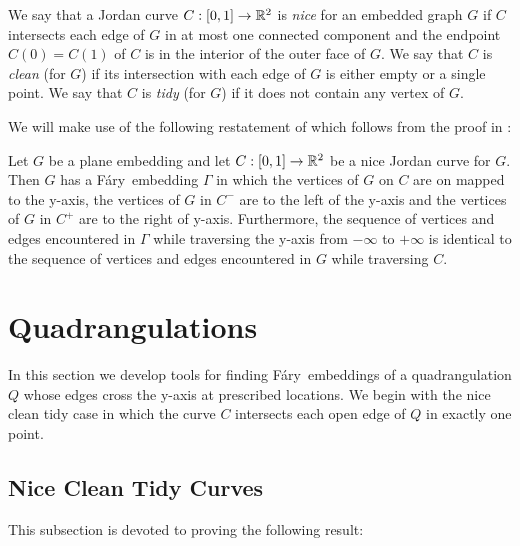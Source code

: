 \documentclass{patmorin}
\newcommand{\Fary}{Fáry}
\begin{document}
We say that a Jordan curve $C:[0,1]\to\mathbb{R}^2$ is \emph{nice} for an embedded
graph $G$ if $C$ intersects each edge of $G$ in at most one connected
component and the endpoint $C(0)=C(1)$ of $C$ is in the interior of the
outer face of $G$.  We say that $C$ is \emph{clean} (for $G$) if its
intersection with each edge of $G$ is either empty or a single point.
We say that $C$ is \emph{tidy} (for $G$) if it does not contain any
vertex of $G$.

We will make use of the following restatement of 
which follows from the proof in \cite{dalozzo.dujmovic.ea:drawing}:
\begin{thm}
   Let $G$ be a plane embedding and let $C:[0,1]\to\mathbb{R}^2$ be a nice
   Jordan curve for $G$.  Then $G$ has a \Fary\ embedding $\Gamma$
   in which the vertices of $G$ on $C$ are on mapped to the y-axis,
   the vertices of $G$ in $C^-$ are to the left of the y-axis and the
   vertices of $G$ in $C^+$ are to the right of y-axis. Furthermore,
   the sequence of vertices and edges encountered in $\Gamma$ while
   traversing the y-axis from $-\infty$ to $+\infty$ is identical to the
   sequence of vertices and edges encountered in $G$ while traversing $C$.
\end{thm}




\section{Quadrangulations}

In this section we develop tools for finding \Fary\ embeddings of
a quadrangulation $Q$ whose edges cross the y-axis at prescribed
locations. We begin with the nice clean tidy case in which the curve $C$
intersects each open edge of $Q$ in exactly one point.

\subsection{Nice Clean Tidy Curves}

This subsection is devoted to proving the following result:
\end{document}
